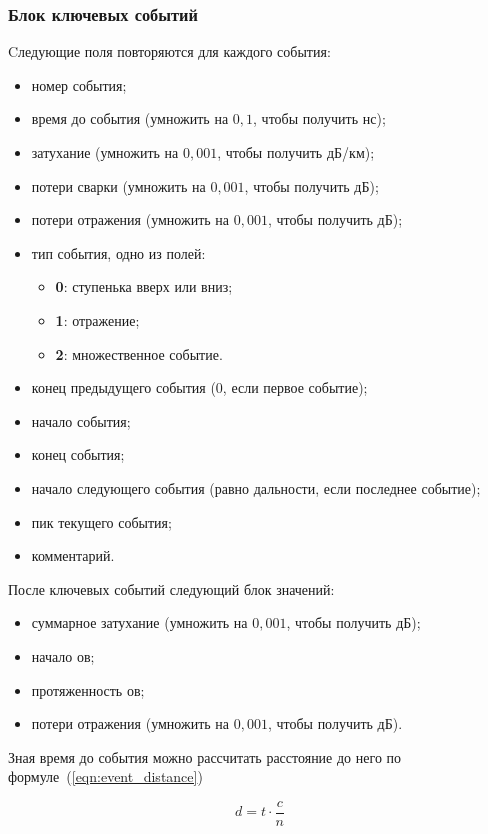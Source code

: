 \subsubsection{Блок ключевых событий}

Cледующие поля повторяются для каждого события:
\begin{itemize}
  \item номер события;
  \item время до события (умножить на $0,1$, чтобы получить нс);
  \item затухание (умножить на $0,001$, чтобы получить дБ/км);
  \item потери сварки (умножить на $0,001$, чтобы получить дБ);
  \item потери отражения (умножить на $0,001$, чтобы получить дБ);
  \item тип события, одно из полей:
  \begin{itemize}
    \item \textbf{0}: ступенька вверх или вниз;
    \item \textbf{1}: отражение;
    \item \textbf{2}: множественное событие.
  \end{itemize}
  \item конец предыдущего события (0, если первое событие);
  \item начало события;
  \item конец события;
  \item начало следующего события (равно дальности, если последнее событие);
  \item пик текущего события;
  \item комментарий.
\end{itemize}

После ключевых событий следующий блок значений:
\begin{itemize}
  \item суммарное затухание (умножить на $0,001$, чтобы получить дБ);
  \item начало \acrshort{ов};
  \item протяженность \acrshort{ов};
  \item потери отражения (умножить на $0,001$, чтобы получить дБ).
\end{itemize}

Зная время до события можно рассчитать расстояние до него по формуле~(\ref{eqn:event_distance})

\begin{equation}
  \label{eqn:event_distance}
  d = t \cdot \frac{c}{n}
\end{equation}

